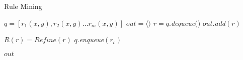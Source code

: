 \begin{algorithm}
\caption{Rule Mining}
\label{rm}
\begin{algorithmic}[1]
    \State $q = [r_1(x,y), r_2(x,y) \dots r_m(x,y)] $
    \State $out = \langle \rangle$
	  \State $r = q.$\emph{dequeue}()
	      \State $out.$\emph{add}$(r)$	
	  \EndIf
	  
	    \State $R(r) = Refine(r)$	    
			\State $q.$\emph{enqueue}$(r_c)$		      
		    \EndIf
	    \EndFor
	    
	  \EndIf  
	  
	\EndWhile
    \State \Return $out$
\EndFunction


\end{algorithmic}
\end{algorithm}
